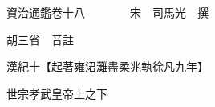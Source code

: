










 


 
 


 

  
  
  
  
  





  
  
  
  
  
 
  

  

  
  
  



  

 
 

  
   




  

  
  


  　　資治通鑑卷十八　　　　宋　司馬光　撰

　　胡三省　音註

　　漢紀十【起著雍涒灘盡柔兆執徐凡九年】

　　世宗孝武皇帝上之下

